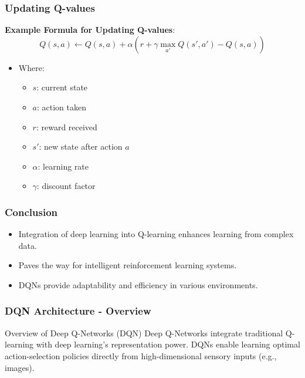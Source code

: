 \documentclass{beamer}
\begin{document}
\begin{frame}[fragile]
    \frametitle{Updating Q-values}
    \textbf{Example Formula for Updating Q-values}:
    \begin{equation}
        Q(s, a) \gets Q(s, a) + \alpha \left( r + \gamma \max_{a'} Q(s', a') - Q(s, a) \right)
    \end{equation}
    \begin{itemize}
        \item Where:
            \begin{itemize}
                \item $s$: current state
                \item $a$: action taken
                \item $r$: reward received
                \item $s'$: new state after action $a$
                \item $\alpha$: learning rate
                \item $\gamma$: discount factor
            \end{itemize}
    \end{itemize}
\end{frame}

\begin{frame}[fragile]
    \frametitle{Conclusion}
    \begin{itemize}
        \item Integration of deep learning into Q-learning enhances learning from complex data.
        \item Paves the way for intelligent reinforcement learning systems.
        \item DQNs provide adaptability and efficiency in various environments.
    \end{itemize}
\end{frame}

\begin{frame}[fragile]
    \frametitle{DQN Architecture - Overview}
    \begin{block}{Overview of Deep Q-Networks (DQN)}
        Deep Q-Networks integrate traditional Q-learning with deep learning's representation power. 
        DQNs enable learning optimal action-selection policies directly from high-dimensional sensory inputs (e.g., images).
    \end{block}
\end{frame}
\end{document}
